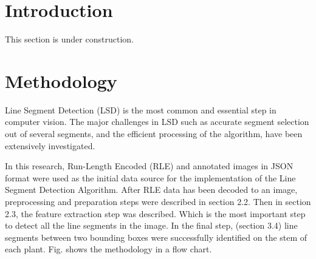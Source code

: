 \documentclass[]{iat}
\begin{document}
	\graphicspath{{./project_graphics/}}


\pagestyle{iat}
\tableofcontents
\chapter{Introduction}
\setcounter{page}{1}
\par
This section is under construction. 
\par
\chapter{Methodology}
Line Segment Detection (LSD) is the most common and essential step in computer vision. The major challenges in LSD such as accurate segment selection out of several segments, and the efficient processing of the algorithm, have been extensively investigated.
\par
In this research, Run-Length Encoded (RLE) and annotated images in JSON format were used as the initial data source for the implementation of the Line Segment Detection Algorithm. After RLE data has been decoded to an image, preprocessing and preparation steps were described in section 2.2. Then in section 2.3, the feature extraction step was described. Which is the most important step to detect all the line segments in the image. In the final step, (section 3.4) line segments between two bounding boxes were successfully identified on the stem of each plant. Fig. shows the methodology in a flow chart.
\\
\end{document}
